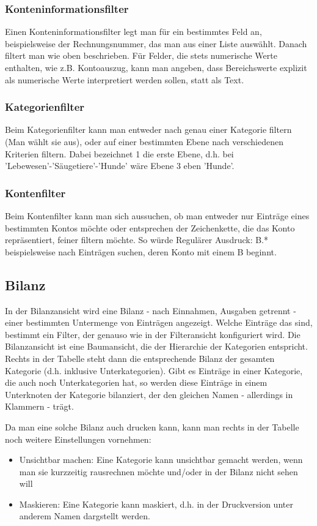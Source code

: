 \documentclass[a4paper,10pt,halfparskip,oneside,smallheadings]{scrbook}
\begin{document}
\subsubsection{Konteninformationsfilter}
Einen Konteninformationsfilter legt man für ein bestimmtes Feld an, beispielsweise der Rechnungsnummer, das man aus einer Liste auswählt. Danach filtert man wie oben beschrieben. Für Felder, die stets numerische Werte enthalten, wie z.B. Kontoauszug, kann man angeben, dass Bereichswerte explizit als numerische Werte interpretiert werden sollen, statt als Text.

\subsubsection{Kategorienfilter} 
Beim Kategorienfilter kann man entweder nach genau einer Kategorie filtern (Man wählt sie aus), oder auf einer bestimmten Ebene nach verschiedenen Kriterien filtern. Dabei bezeichnet 1 die erste Ebene, d.h. bei 'Lebewesen'-'Säugetiere'-'Hunde' wäre Ebene 3 eben 'Hunde'.

\subsubsection{Kontenfilter}
Beim Kontenfilter kann man sich aussuchen, ob man entweder nur Einträge eines bestimmten Kontos möchte oder entsprechen der Zeichenkette, die das Konto repräsentiert, feiner filtern möchte. So würde Regulärer Ausdruck: B.* beispielsweise nach Einträgen suchen, deren Konto mit einem B beginnt.

\subsection{Bilanz}
In der Bilanzansicht wird eine Bilanz - nach Einnahmen, Ausgaben getrennt - einer bestimmten Untermenge von Einträgen angezeigt. Welche Einträge das sind, bestimmt ein Filter, der genauso wie in der Filteransicht konfiguriert wird. Die Bilanzansicht ist eine Baumansicht, die der Hierarchie der Kategorien entspricht. Rechts in der Tabelle steht dann die entsprechende Bilanz der gesamten Kategorie (d.h. inklusive Unterkategorien). Gibt es Einträge in einer Kategorie, die auch noch Unterkategorien hat, so werden diese Einträge in einem Unterknoten der Kategorie bilanziert, der den gleichen Namen - allerdings in Klammern - trägt.

Da man eine solche Bilanz auch drucken kann, kann man rechts in der Tabelle noch weitere Einstellungen vornehmen:
\begin{itemize}
 \item Unsichtbar machen: Eine Kategorie kann unsichtbar gemacht werden, wenn man sie kurzzeitig rausrechnen möchte und/oder in der Bilanz nicht sehen will
 \item Maskieren: Eine Kategorie kann maskiert, d.h. in der Druckversion unter anderem Namen dargstellt werden.
\end{itemize}
\end{document}
